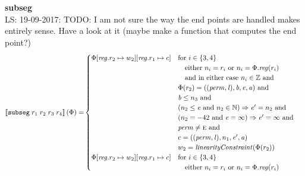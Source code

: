\documentclass[a4paper]{article}
\newcommand\lau[1]{{\color{purple} \sf \footnotesize {LS: #1}}\\}
\newcommand{\sem}[1]{\left\llbracket #1 \right\rrbracket}
\newcommand{\tand}{\text{ and }}
\newcommand{\targetcolor}[1]{\color{black}}
\newcommand{\trg}[1]{{\targetcolor{} #1}}
\newcommand{\zinstr}[1]{\texttt{#1}}
\newcommand{\fourinstr}[5]{
  \ifthenelse{\equal{#2#3#4#5}{}}
  {\zinstr{#1}}
  {\zinstr{#1} \; #2 \; #3 \; #4 \; #5}
}
\newcommand{\tsubseg}[4]{\fourinstr{\trg{subseg}}{#1}{#2}{#3}{#4}}
\newcommand{\nats}{\mathbb{N}}
\newcommand{\ints}{\mathbb{Z}}
\newcommand{\update}[2]{[#1 \mapsto #2]}
\newcommand{\updReg}[2]{\update{\reg.#1}{#2}}
\newcommand{\perm}{\var{perm}}
\newcommand{\lin}{\var{l}}
\newcommand{\var}[1]{\mathit{#1}}
\newcommand{\reg}{\var{reg}}
\newcommand{\baddr}{\var{b}}
\newcommand{\eaddr}{\var{e}}
\newcommand{\aaddr}{\var{a}}
\newcommand{\plainperm}[1]{\textsc{#1}}
\newcommand{\enter}{\plainperm{e}}
\newcommand{\plainfun}[2]{
  \ifthenelse{\equal{#2}{}}
  {\mathit{#1}}
  {\mathit{#1}(#2)}
}
\newcommand{\linCons}[1]{\plainfun{linearityConstraint}{#1}}
\begin{document}
\noindent\textbf{subseg}\\
\lau{19-09-2017: TODO: I am not sure the way the end points are handled makes entirely sense. Have a look at it (maybe make a function that computes the end point?)}
\begin{align*}
  \sem{\tsubseg{r_1}{r_2}{r_3}{r_4}}(\Phi) = &
                                               \begin{cases}
                                                 \Phi\updReg{r_2}{w_2}\updReg{r_1}{c} &
                                                 \arraycolsep=0pt
                                                 \begin{array}[t]{l}
                                                   \text{for $i \in \{3, 4\}$ } \\
                                                   \quad \text{either $n_i = r_i$ or $n_i = \Phi.\reg(r_i)$}\\
                                                   \quad \text{and in either case $n_i \in \ints$ and} \\
                                                   \Phi(r_2) = ((\perm,\lin),\baddr,\eaddr,\aaddr) \tand \\
                                                   \baddr \leq n_3 \tand \\
                                                   (n_2 \leq \eaddr \tand n_2 \in \nats) \Rightarrow \eaddr' = n_2 \tand \\
                                                   (n_2 = -42 \tand \eaddr = \infty) \Rightarrow \eaddr' = \infty \tand\\
                                                   \perm \neq \enter \tand\\
                                                   c = ((\perm,\lin),n_1,\eaddr',\aaddr)\\
                                                   w_2 = \linCons{\Phi(r_2)}
                                                 \end{array}
\\
                                                 \Phi\updReg{r_2}{w_2}\updReg{r_1}{c} &
                                                 \arraycolsep=0pt
                                                 \begin{array}[t]{l}
                                                   \text{for $i \in \{3, 4\}$ } \\
                                                   \quad \text{either $n_i = r_i$ or $n_i = \Phi.\reg(r_i)$}\\

\end{array}
\end{cases}
\end{align*}
\end{document}
